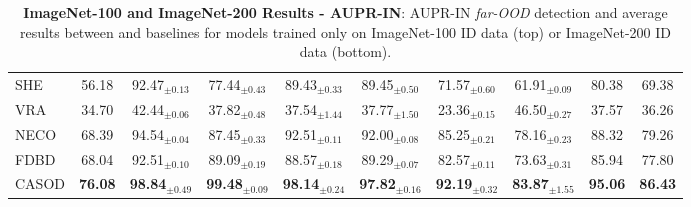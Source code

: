 \begin{table}[t!]
{\begin{tabular}{|l|c|cccccc|c|c|}
SHE    & 56.18 & 92.47$_{\pm 0.13}$ & 77.44$_{\pm 0.43}$ & 89.43$_{\pm 0.33}$ & 89.45$_{\pm 0.50}$ & 71.57$_{\pm 0.60}$ & 61.91$_{\pm 0.09}$ & 80.38 & 69.38 \\
VRA    & 34.70 & 42.44$_{\pm 0.06}$ & 37.82$_{\pm 0.48}$ & 37.54$_{\pm 1.44}$ & 37.77$_{\pm 1.50}$ & 23.36$_{\pm 0.15}$ & 46.50$_{\pm 0.27}$ & 37.57 & 36.26 \\
NECO   &  68.39 & 94.54$_{\pm 0.04}$ & 87.45$_{\pm 0.33}$ & 92.51$_{\pm 0.11}$ & 92.00$_{\pm 0.08}$ & 85.25$_{\pm 0.21}$ & 78.16$_{\pm 0.23}$ & 88.32 & 79.26 \\
FDBD   &  68.04 & 92.51$_{\pm 0.10}$ & 89.09$_{\pm 0.19}$ & 88.57$_{\pm 0.18}$ & 89.29$_{\pm 0.07}$ & 82.57$_{\pm 0.11}$ & 73.63$_{\pm 0.31}$ & 85.94 & 77.80 \\ \hline
CASOD  &  \textbf{76.08} & \textbf{98.84}$_{\pm 0.49}$ & \textbf{99.48}$_{\pm 0.09}$ & \textbf{98.14}$_{\pm 0.24}$ & \textbf{97.82}$_{\pm 0.16}$ & \textbf{92.19}$_{\pm 0.32}$ & \textbf{83.87}$_{\pm 1.55}$ & \textbf{95.06} & \textbf{86.43} \\ \hline
		\end{tabular}
	}
	\caption{\textbf{ImageNet-100 and ImageNet-200 Results - AUPR-IN}: AUPR-IN \textit{far-OOD} detection and average results between \sys and baselines for models trained only on ImageNet-100 ID data (top) or ImageNet-200 ID data (bottom).
	}
	\label{tab:table_ood_auprin_f}
\end{table}

